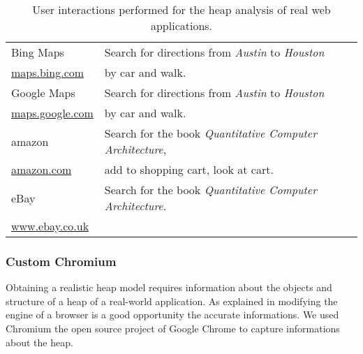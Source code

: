 \begin{table}
\begin{tabular}{l l}
		Bing Maps 				& Search for directions from \textit{Austin} to \textit{Houston}		\\ 
		\url{maps.bing.com} 	& by car and walk. 														\\ \midrule

		Google Maps				& Search for directions from \textit{Austin} to \textit{Houston}		\\ 
		\url{maps.google.com} 	& by car and walk. 														\\ \midrule

		amazon 					& Search for the book \textit{Quantitative Computer Architecture},		\\ 
		\url{amazon.com} 		& add to shopping cart, look at cart. 									\\ \midrule

		eBay 					& Search for the book \textit{Quantitative Computer Architecture}. 		\\ 
		\url{www.ebay.co.uk} 	& 																		\\ \bottomrule

	\end{tabular}
	\caption{User interactions performed for the heap analysis of real web applications.}
	\label{tab:real_world_apps}
\end{table}
		
\subsubsection{Custom Chromium} \label{sec:custom_chromium}
Obtaining a realistic \JS heap model requires information about the objects and structure of a heap of a real-world \JS application. As explained in \cite{JSMeter2009} modifying the \JS engine of a browser is a good opportunity the accurate informations. We used Chromium \cite{Chromium} the open source project of Google Chrome \cite{Chrome} to capture informations about the \JS heap.

